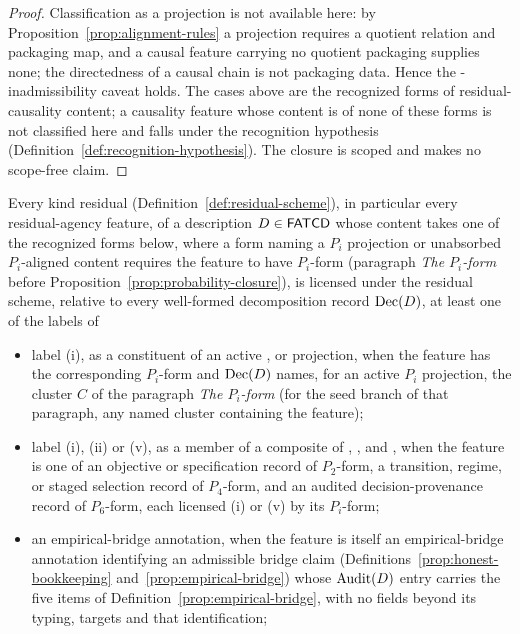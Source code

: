 \begin{proof}
Classification as a \Pfive{} projection is not available here: by
Proposition~\ref{prop:alignment-rules} a \Pfive{} projection requires a
quotient relation and packaging map, and a causal feature carrying no
quotient packaging supplies none; the directedness of a causal chain is
not packaging data. Hence the \Pfive{}-inadmissibility caveat holds.
The cases above are the recognized forms of residual-causality content; a
causality feature whose content is of none of these forms is not classified here
and falls under the recognition hypothesis
(Definition~\ref{def:recognition-hypothesis}). The closure is scoped and makes no
scope-free claim.
\end{proof}

\begin{proposition}\label{prop:agency-closure}
Every kind residual (Definition~\ref{def:residual-scheme}), in particular every residual-agency feature, of a description
\(D \in \mathsf{FATCD}{}\) whose content takes one of the recognized forms below,
where a form naming a \(P_i\) projection or unabsorbed \(P_i\)-aligned content
requires the feature to have \(P_i\)-form (paragraph \emph{The \(P_i\)-form}
before Proposition~\ref{prop:probability-closure}),
is licensed under the residual scheme, relative to every well-formed
decomposition record \(\operatorname{Dec}\!\left(D\right)\), at least one of the labels of
\begin{itemize}[topsep=2pt,itemsep=1pt]
  \item label (i), as a constituent of an active \Ptwo{}, \Pfour{} or \Psix{}
    projection, when the feature has the
    corresponding \(P_i\)-form and \(\operatorname{Dec}\!\left(D\right)\) names, for an active \(P_i\) projection, the cluster \(C\) of the paragraph \emph{The \(P_i\)-form} (for the seed branch of that paragraph, any named cluster containing the feature);
  \item label (i), (ii) or (v), as a member of a composite of \Ptwo{},
    \Pfour{}, and \Psix{}, when the feature is one of an objective or
    specification record of \(P_2\)-form, a
    transition, regime, or staged selection record of \(P_4\)-form, and an
    audited decision-provenance record of \(P_6\)-form, each licensed (i) or (v) by its
    \(P_i\)-form;
  \item an empirical-bridge annotation, when the feature is itself an empirical-bridge annotation identifying an admissible bridge claim (Definitions~\ref{prop:honest-bookkeeping} and~\ref{prop:empirical-bridge}) whose \(\operatorname{Audit}\!\left(D\right)\) entry carries the five items of Definition~\ref{prop:empirical-bridge}, with no fields beyond its typing, targets and that identification;

\end{itemize}
\end{proposition}
